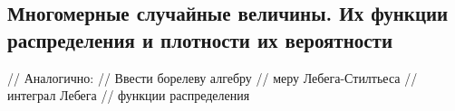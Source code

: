 \subsection{Многомерные случайные величины. Их функции распределения и
плотности их
вероятности}\label{ux43cux43dux43eux433ux43eux43cux435ux440ux43dux44bux435-ux441ux43bux443ux447ux430ux439ux43dux44bux435-ux432ux435ux43bux438ux447ux438ux43dux44b.-ux438ux445-ux444ux443ux43dux43aux446ux438ux438-ux440ux430ux441ux43fux440ux435ux434ux435ux43bux435ux43dux438ux44f-ux438-ux43fux43bux43eux442ux43dux43eux441ux442ux438-ux438ux445-ux432ux435ux440ux43eux44fux442ux43dux43eux441ux442ux438}

// Аналогично: // Ввести борелеву алгебру // меру Лебега-Стилтьеса //
интеграл Лебега // функции распределения
